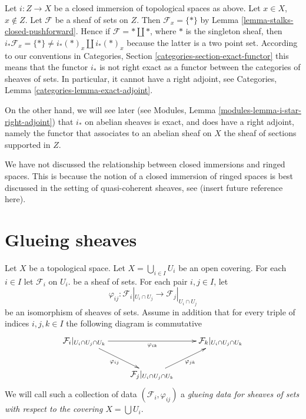 \begin{remark}
\label{remark-i-star-not-exact}
Let $i : Z \to X$ be a closed immersion of topological spaces as above.
Let $x \in X$, $x \not \in Z$. Let $\mathcal{F}$ be a sheaf of sets
on $Z$. Then $\mathcal{F}_x = \{ * \}$
by Lemma \ref{lemma-stalks-closed-pushforward}.
Hence if $\mathcal{F} = * \amalg *$, where
$*$ is the singleton sheaf, then
$i_*\mathcal{F}_x = \{*\} \not = i_*(*)_x \amalg i_*(*)_x$
because the latter is a two point set.
According to our conventions in
Categories, Section \ref{categories-section-exact-functor}
this means that the functor $i_*$ is not right exact
as a functor between the categories of sheaves of sets.
In particular, it cannot have a right adjoint, see
Categories, Lemma \ref{categories-lemma-exact-adjoint}.

\medskip\noindent
On the other hand, we will see later (see
Modules, Lemma \ref{modules-lemma-i-star-right-adjoint})
that $i_*$ on abelian sheaves is exact, and does have a right
adjoint, namely the functor that associates to an abelian sheaf on $X$
the sheaf of sections supported in $Z$.
\end{remark}

\begin{remark}
\label{remark-closed-immersion-spaces}
We have not discussed the relationship between closed immersions
and ringed spaces. This is because the notion of a closed immersion
of ringed spaces is best discussed in the setting of quasi-coherent
sheaves, see (insert future reference here).
\end{remark}

\section{Glueing sheaves}
\label{section-glueing-sheaves}

\noindent
Let $X$ be a topological space.
Let $X = \bigcup_{i\in I} U_i$ be an open covering.
For each $i \in I$ let $\mathcal{F}_i$ on $U_i$. 
be a sheaf of sets. For each pair $i, j \in I$, let
$$
\varphi_{ij} : \mathcal{F}_i|_{U_i \cap U_j}
\longrightarrow
\mathcal{F}_j|_{U_i \cap U_j}
$$
be an isomorphism of sheaves of sets. Assume in addition
that for every triple of indices $i,j,k \in I$ the
following diagram is commutative
$$
\xymatrix{
\mathcal{F}_i|_{U_i \cap U_j \cap U_k}
\ar[rr]_{\varphi_{ik}}
\ar[rd]_{\varphi_{ij}} & &
\mathcal{F}_k|_{U_i \cap U_j \cap U_k} \\
&
\mathcal{F}_j|_{U_i \cap U_j \cap U_k}
\ar[ru]_{\varphi_{jk}}
}
$$
We will call such a collection of data
$(\mathcal{F}_i, \varphi_{ij})$
a {\it glueing data for sheaves of sets with respect to
the covering $X = \bigcup U_i$}.

